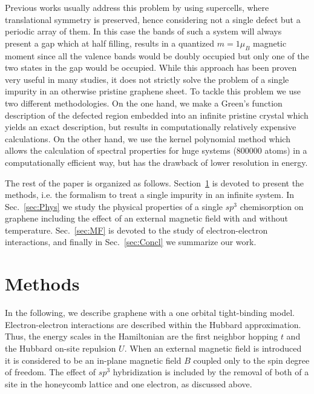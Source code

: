 \documentclass[aps,prb,twocolumn,superscriptaddress]{revtex4-1}
\begin{document}
Previous works usually address this problem by using supercells, where translational symmetry is preserved, hence considering not a single defect but a periodic array of them.\cite{Duplock2004,Boukhvalov2008,Yazyev2010,Sofo2012,gonzalez2016atomic}
In this case the bands of such a system will always present a gap which at half filling, results in a quantized $m=1\mu_B$ magnetic moment since all the valence bands would be doubly occupied but only one of the two states in the gap would be occupied.
While this approach has been proven very useful in many studies, it does not strictly solve the problem of a single impurity in an otherwise pristine graphene sheet.
To tackle this problem we use two different methodologies. On the one hand, we
make a Green's function description of the defected region embedded into an
infinite pristine crystal which yields an exact description, but results in
computationally relatively expensive calculations. On the other hand, we use
the kernel polynomial method which allows the calculation of spectral
properties for huge systems (800000 atoms) in a computationally efficient way,
but has the drawback of lower resolution in energy.

The rest of the paper is organized as follows. Section~\ref{sec:GF} is devoted
to present the methods, i.e. the formalism to treat a single impurity in an
infinite system. In Sec.~\ref{sec:Phys} we study the physical properties of a
single $sp^3$ chemisorption on graphene including the effect of an external
magnetic field with and without temperature. Sec.~\ref{sec:MF} is devoted to
the study of electron-electron interactions, and finally in
Sec.~\ref{sec:Concl} we summarize our work.


\section{Methods}
\label{sec:GF}
In the following, we describe graphene with a one orbital tight-binding model.  Electron-electron interactions are described within the Hubbard approximation.  Thus, the energy scales in the Hamiltonian are the first neighbor hopping $t$ and the Hubbard on-site repulsion $U$. When an external magnetic field is introduced it is considered to be an in-plane magnetic field $B$ coupled only to the spin degree of freedom.
The effect of $sp^3$ hybridization is included by the removal of both of a site in the honeycomb lattice and one electron, as discussed above.
\end{document}
